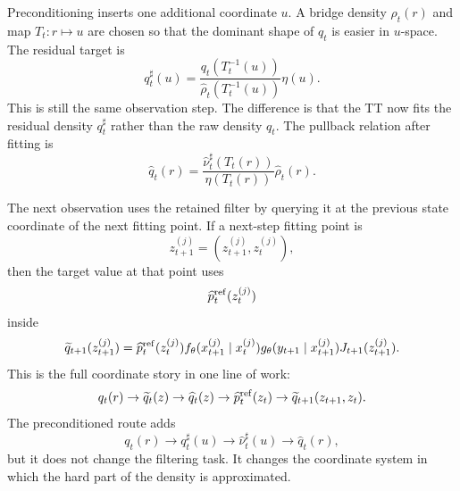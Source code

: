 \documentclass[11pt]{article}
\numberwithin{equation}{section}
\begin{document}
Preconditioning inserts one additional coordinate \(u\).  A bridge density
\(\rho_t(r)\) and map \(T_t:r\mapsto u\) are chosen so that the dominant shape
of \(q_t\) is easier in \(u\)-space.  The residual target is
\begin{equation}
    q_t^\sharp(u)
    =
    \frac{q_t(T_t^{-1}(u))}
         {\widehat\rho_t(T_t^{-1}(u))}
    \eta(u).
    \label{eq:p25-walk-11}
\end{equation}
This is still the same observation step.  The difference is that the TT now
fits the residual density \(q_t^\sharp\) rather than the raw density \(q_t\).
The pullback relation after fitting is
\begin{equation}
    \widehat q_t(r)
    =
    \frac{\widehat\nu_t^\sharp(T_t(r))}
         {\eta(T_t(r))}
    \widehat\rho_t(r).
    \label{eq:p25-walk-12}
\end{equation}

The next observation uses the retained filter by querying it at the previous
state coordinate of the next fitting point.  If a next-step fitting point is
\begin{equation}
    z^{(j)}_{t+1}=(z_{t+1}^{(j)},z_t^{(j)}),
    \label{eq:p25-walk-13}
\end{equation}
then the target value at that point uses
\begin{equation}
    \widehat p_t^{\rm ref}(z_t^{(j)})
    \label{eq:p25-walk-14}
\end{equation}
inside
\begin{equation}
    \widetilde q_{t+1}(z^{(j)}_{t+1})
    =
    \widehat p_t^{\rm ref}(z_t^{(j)})
    f_\theta(x_{t+1}^{(j)}\mid x_t^{(j)})
    g_\theta(y_{t+1}\mid x_{t+1}^{(j)})
    J_{t+1}(z^{(j)}_{t+1}).
    \label{eq:p25-walk-15}
\end{equation}
This is the full coordinate story in one line of work:
\begin{equation}
    q_t(r)
    \to
    \widetilde q_t(z)
    \to
    \widehat q_t(z)
    \to
    \widehat p_t^{\rm ref}(z_t)
    \to
    \widetilde q_{t+1}(z_{t+1},z_t).
    \label{eq:p25-walk-16}
\end{equation}
The preconditioned route adds
\begin{equation}
    q_t(r)\to q_t^\sharp(u)\to\widehat\nu_t^\sharp(u)\to\widehat q_t(r),
    \label{eq:p25-walk-17}
\end{equation}
but it does not change the filtering task.  It changes the coordinate system in
which the hard part of the density is approximated.
\end{document}
